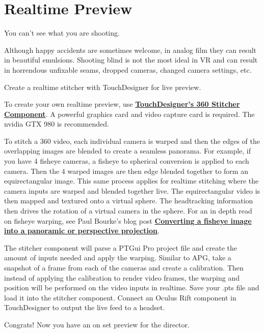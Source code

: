\chapter{Realtime Preview}
\pagecolor{white}
\label{chap:11}
\begin{fullwidth}

\problem

{\large You can’t see what you are shooting. \par}


Although happy accidents are sometimes welcome, in analog film they can result in beautiful emulsions. Shooting blind is not the most ideal in VR and can result in horrendous unfixable seams, dropped cameras, changed camera settings, etc. 


\solution

{\large Create a realtime stitcher with TouchDesigner for live preview. \par}

To create your own realtime preview, use \textbf{\href{https://www.derivative.ca/wiki088/index.php?title=Stitcher}{TouchDesigner’s 360 Stitcher Component}}. A powerful graphics card and video capture card is required. The nvidia GTX 980 is recommended. 

To stitch a 360 video, each individual camera is warped and then the edges of the overlapping images are blended to create a seamless panorama. For example, if you have 4 fisheye cameras, a fisheye to spherical conversion is applied to each camera. Then the 4 warped images are then edge blended together to form an equirectangular image. This same process applies for realtime stitching where the camera inputs are warped and blended together live. The equirectangular video is then mapped and textured onto a virtual sphere. The headtracking information then drives the rotation of a virtual camera in the sphere. For an in depth read on fisheye warping, see Paul Bourke's blog post \textbf{\href{http://paulbourke.net/dome/fish2/}{Converting a fisheye image into a panoramic or perspective projection}}.

The stitcher component will parse a PTGui Pro project file and create the amount of inputs needed and apply the warping. Similar to APG, take a snapshot of a frame from each of the cameras and create a calibration. Then instead of applying the calibration to render video frames, the warping and position will be performed on the video inputs in realtime. Save your .pts file and load it into the stitcher component. Connect an Oculus Rift component in TouchDesigner to output the live feed to a headset.

Congrats! Now you have an on set preview for the director.

\clearpage
\end{fullwidth}
